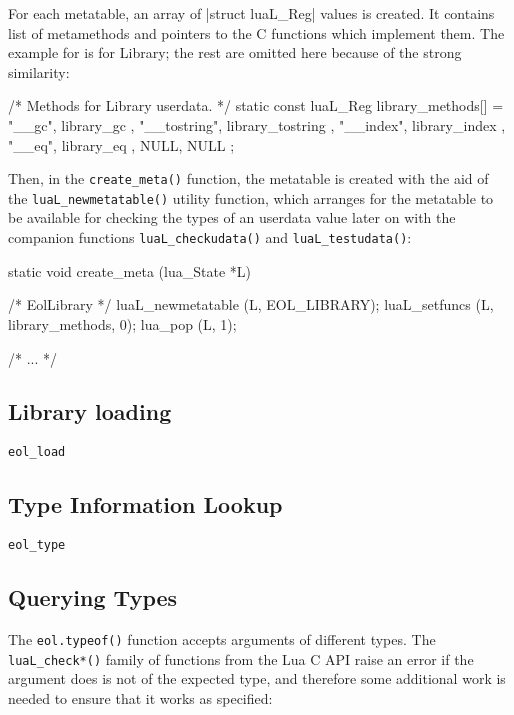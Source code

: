 For each metatable, an array of \Mc|struct luaL_Reg| values is created. It
contains list of metamethods and pointers to the C functions which implement
them. The example for is for \textsf{Library}; the rest are omitted here
because of the strong similarity:

\begin{ccode}
/* Methods for Library userdata. */
static const luaL_Reg library_methods[] = {
    { "__gc",       library_gc       },
    { "__tostring", library_tostring },
    { "__index",    library_index    },
    { "__eq",       library_eq       },
    { NULL, NULL }
};
\end{ccode}

Then, in the \verb|create_meta()| function, the metatable is created with the
aid of the \verb|luaL_newmetatable()| utility function, which arranges for the
metatable to be available for checking the types of an userdata value later on
with the companion functions \verb|luaL_checkudata()| and \verb|luaL_testudata()|:

\begin{ccode}
static void
create_meta (lua_State *L) {
    /* EolLibrary */
    luaL_newmetatable (L, EOL_LIBRARY);
    luaL_setfuncs (L, library_methods, 0);
    lua_pop (L, 1);

    /* ... */
}
\end{ccode}


\subsection{Library loading}

  \verb|eol_load| 

\subsection{Type Information Lookup}

  \verb|eol_type| 

\subsection{Querying Types}

The \verb|eol.typeof()| function accepts arguments of different types.
The \verb|luaL_check*()| family of functions from the Lua C API raise an error
if the argument does is not of the expected type, and therefore some
additional work is needed to ensure that it works as specified:


